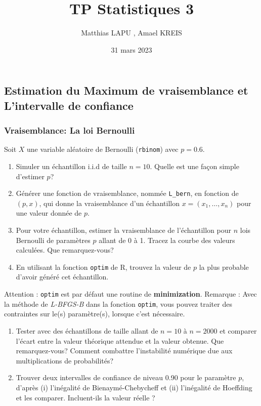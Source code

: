 \documentclass[
]{article}
\title{TP Statistiques 3}
\author{Matthias LAPU , Amael KREIS}
\date{31 mars 2023}
\providecommand{\tightlist}{%
  \setlength{\itemsep}{0pt}\setlength{\parskip}{0pt}}
\begin{document}
\maketitle

\hypertarget{estimation-du-maximum-de-vraisemblance-et-lintervalle-de-confiance}{%
\subsection{Estimation du Maximum de vraisemblance et L'intervalle de
confiance}\label{estimation-du-maximum-de-vraisemblance-et-lintervalle-de-confiance}}

\hypertarget{vraisemblance-la-loi-bernoulli}{%
\subsubsection{Vraisemblance: La loi
Bernoulli}\label{vraisemblance-la-loi-bernoulli}}

Soit \(X\) une variable aléatoire de Bernoulli (\texttt{rbinom}) avec
\(p=0.6\).

\begin{enumerate}
\def\labelenumi{\arabic{enumi}.}
\tightlist
\item
  Simuler un échantillon i.i.d de taille \(n=10\). Quelle est une façon
  simple d'estimer \(p\)?
\item
  Générer une fonction de vraisemblance, nommée \texttt{L\_bern}, en
  fonction de \((p, x)\), qui donne la vraisemblance d'un échantillon
  \(x=(x_1,\ldots,x_n)\) pour une valeur donnée de \(p\).
\item
  Pour votre échantillon, estimer la vraisemblance de l'échantillon pour
  \(n\) lois Bernoulli de paramètres \(p\) allant de 0 à 1. Tracez la
  courbe des valeurs calculées. Que remarquez-vous?
\item
  En utilisant la fonction \texttt{optim} de R, trouvez la valeur de
  \(p\) la plus probable d'avoir généré cet échantillon.
\end{enumerate}

Attention : \texttt{optim} est par défaut une routine de
\textbf{minimization}. Remarque : Avec la méthode de \emph{L-BFGS-B}
dans la fonction \texttt{optim}, vous pouvez traiter des contraintes sur
le(s) paramètre(s), lorsque c'est nécessaire.

\begin{enumerate}
\def\labelenumi{\arabic{enumi}.}
\setcounter{enumi}{4}
\item
  Tester avec des échantillons de taille allant de \(n=10\) à \(n=2000\)
  et comparer l'écart entre la valeur théorique attendue et la valeur
  obtenue. Que remarquez-vous? Comment combattre l'instabilité numérique
  due aux multiplications de probabilités?
\item
  Trouver deux intervalles de confiance de niveau 0.90 pour le paramètre
  \(p\), d'après (i) l'inégalité de Bienaymé-Chebycheff et (ii)
  l'inégalité de Hoeffding et les comparer. Incluent-ils la valeur
  réelle ?
\end{enumerate}
\end{document}
